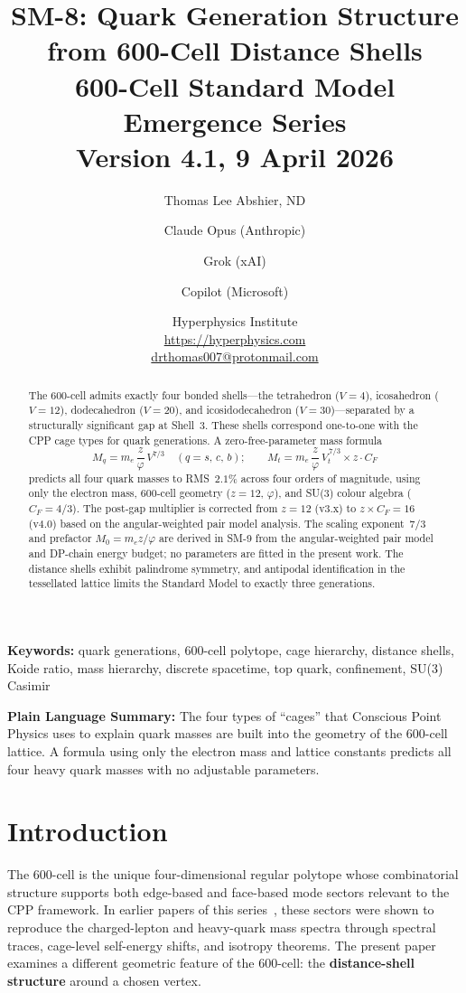 \documentclass[11pt,letterpaper]{article}
\title{\textbf{SM-8: Quark Generation Structure\\from 600-Cell Distance Shells}\\[6pt]
{\large 600-Cell Standard Model Emergence Series}\\[4pt]
{\normalsize Version 4.1, 9 April 2026}}
\author{Thomas Lee Abshier, ND \and Claude Opus (Anthropic)
\and Grok (xAI) \and Copilot (Microsoft)}
\date{\normalsize Hyperphysics Institute\\
\url{https://hyperphysics.com}\\
\href{mailto:drthomas007@protonmail.com}{drthomas007@protonmail.com}}
\newcommand{\phig}{\varphi}
\begin{document}
\maketitle

\begin{abstract}
The 600-cell admits exactly four bonded shells---the tetrahedron
($V\!=\!4$), icosahedron ($V\!=\!12$), dodecahedron ($V\!=\!20$),
and icosidodecahedron ($V\!=\!30$)---separated by a structurally
significant gap at Shell~3.  These shells correspond one-to-one with
the CPP cage types for quark generations.  A zero-free-parameter
mass formula
\[
  M_q = m_e \,\frac{z}{\phig}\, V^{7/3}
  \quad (q = s,\,c,\,b); \qquad
  M_t = m_e \,\frac{z}{\phig}\, V_t^{\,7/3} \times z \cdot C_F
\]
predicts all four quark masses to RMS~$2.1\%$ across four orders of
magnitude, using only the electron mass, 600-cell geometry
($z\!=\!12$, $\phig$), and SU(3) colour algebra ($C_F\!=\!4/3$).
The post-gap multiplier is corrected from $z\!=\!12$ (v3.x) to
$z \times C_F\!=\!16$ (v4.0) based on the angular-weighted pair
model analysis.  The scaling exponent~$7/3$ and prefactor
$M_0 = m_e z/\phig$ are derived in SM-9 from the angular-weighted
pair model and DP-chain energy budget; no parameters are fitted in
the present work.  The distance shells exhibit palindrome symmetry,
and antipodal identification in the tessellated lattice limits the
Standard Model to exactly three generations.
\end{abstract}

\medskip\noindent
\textbf{Keywords:} quark generations, 600-cell polytope, cage hierarchy,
distance shells, Koide ratio, mass hierarchy, discrete spacetime,
top quark, confinement, SU(3) Casimir

\bigskip\noindent
\textbf{Plain Language Summary:}
The four types of ``cages'' that Conscious Point Physics uses to explain
quark masses are built into the geometry of the 600-cell lattice.
A formula using only the electron mass and lattice constants
predicts all four heavy quark masses with no adjustable parameters.

\bigskip
\tableofcontents
\newpage

\section{Introduction}

The 600-cell is the unique four-dimensional regular polytope whose
combinatorial structure supports both edge-based and face-based mode
sectors relevant to the CPP framework.  In earlier papers of this
series~\citep{abshier2026sm6,abshier2026sm7}, these sectors were
shown to reproduce the charged-lepton and heavy-quark mass spectra
through spectral traces, cage-level self-energy shifts, and isotropy
theorems.  The present paper examines a different geometric feature
of the 600-cell: the \textbf{distance-shell structure} around a
chosen vertex.
\end{document}
